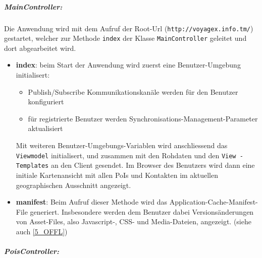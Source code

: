 \subparagraph{MainController:}
Die Anwendung wird mit dem Aufruf der Root-Url (\texttt{http://voyagex.info.tm/}) gestartet, welcher
zur Methode \texttt{index} der Klasse \texttt{MainController} geleitet und dort abgearbeitet wird. 
\begin{itemize}[leftmargin=*,noitemsep,topsep=1ex,parsep=0pt,partopsep=0pt]
\item \textbf{index}: beim Start der Anwendung wird zuerst eine Benutzer-Umgebung initialisert:
  \begin{itemize}[leftmargin=*,noitemsep,topsep=1ex,parsep=0pt,partopsep=0pt]
    \item Publish/Subscribe Kommunikationskanäle werden für den Benutzer konfiguriert%
    \item für registrierte Benutzer werden Synchronisations-Management-Parameter aktualisiert%
  \end{itemize}
Mit weiteren Benutzer-Umgebungs-Variablen wird anschliessend das \texttt{Viewmodel} initialisert, und zusammen mit den Rohdaten und den \texttt{View - Templates} an den Client gesendet. Im Browser des Benutzers wird dann eine  initiale Kartenansicht mit allen PoIs und Kontakten im aktuellen geographischen Ausschnitt angezeigt.
\item \textbf{manifest}: Beim Aufruf dieser Methode wird das Application-Cache-Manifest-File generiert. Insbesondere werden dem Benutzer dabei Versionsänderungen von Asset-Files, also Javascript-, CSS- und Media-Dateien, angezeigt. (siehe auch \ref{5_OFFL})
\end{itemize}
\subparagraph{PoisController:}
